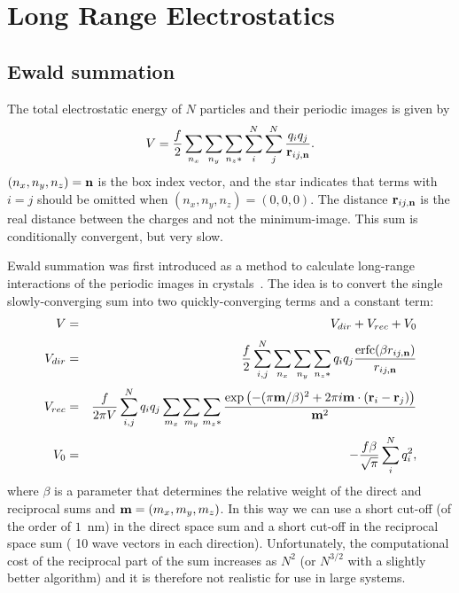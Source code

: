 \newcommand{\dr}{{\rm d}r}
\newcommand{\avcsix}{\left< C_6 \right>}

\section{Long Range Electrostatics}
\label{sec:lr_elstat}
\subsection{Ewald summation}
\label{sec:ewald}
The total electrostatic energy of $N$ particles and their periodic
images is given by
\begin{equation}
V=\frac{f}{2}\sum_{n_x}\sum_{n_y}
\sum_{n_{z}*} \sum_{i}^{N} \sum_{j}^{N}
\frac{q_i q_j}{{\bf r}_{ij,{\bf n}}}.
\label{eqn:totalcoulomb}
\end{equation}
$(n_x,n_y,n_z)={\bf n}$ is the box index vector, and the star indicates that
terms with $i=j$ should be omitted when $(n_x,n_y,n_z)=(0,0,0)$. The
distance ${\bf r}_{ij,{\bf n}}$ is the real distance between the charges and
not the minimum-image. This sum is conditionally convergent, but
very slow.

Ewald summation was first introduced as a method to calculate
long-range interactions of the periodic images in
crystals~\cite{Ewald21}. The idea is to convert the single
slowly-converging sum  into two
quickly-converging terms and a constant term:
\begin{eqnarray}
V &=& V_{dir} + V_{rec} + V_{0} \\[0.5ex]
V_{dir} &=& \frac{f}{2} \sum_{i,j}^{N}
\sum_{n_x}\sum_{n_y}
\sum_{n_{z}*} q_i q_j \frac{\mbox{erfc}(\beta {r}_{ij,{\bf n}} )}{{r}_{ij,{\bf n}}} \\[0.5ex]
V_{rec} &=& \frac{f}{2 \pi V} \sum_{i,j}^{N} q_i q_j
\sum_{m_x}\sum_{m_y}
\sum_{m_{z}*} \frac{\exp{\left( -(\pi {\bf m}/\beta)^2 + 2 \pi i
      {\bf m} \cdot ({\bf r}_i - {\bf r}_j)\right)}}{{\bf m}^2} \\[0.5ex]
V_{0} &=& -\frac{f \beta}{\sqrt{\pi}}\sum_{i}^{N} q_i^2,
\end{eqnarray}
where $\beta$ is a parameter that determines the relative weight of the
direct and reciprocal sums and ${\bf m}=(m_x,m_y,m_z)$.
In this way we can use a short cut-off (of the order of $1$~nm) in the direct space sum and a
short cut-off in the reciprocal space sum ({\eg} 10 wave vectors in each
direction). Unfortunately, the computational cost of the reciprocal
part of the sum increases as $N^2$
(or $N^{3/2}$ with a slightly better algorithm) and it is therefore not
realistic for use in large systems.

